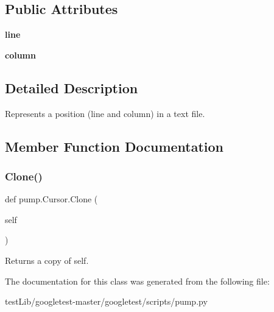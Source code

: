 \subsection*{Public Attributes}
\begin{DoxyCompactItemize}
\item 
\mbox{\label{classpump_1_1Cursor_aee8d8b67360da7fc4e635540cb41d48c}} 
{\bfseries line}
\item 
\mbox{\label{classpump_1_1Cursor_ae73db76c3a845a82afb334633864254e}} 
{\bfseries column}
\end{DoxyCompactItemize}


\subsection{Detailed Description}
\begin{DoxyVerb}Represents a position (line and column) in a text file.\end{DoxyVerb}
 

\subsection{Member Function Documentation}
\mbox{\label{classpump_1_1Cursor_af68c9be83b0af87db441b21bc6ce8114}} 
\subsubsection{\texorpdfstring{Clone()}{Clone()}}
{\footnotesize\ttfamily def pump.\+Cursor.\+Clone (\begin{DoxyParamCaption}\item[{}]{self }\end{DoxyParamCaption})}

\begin{DoxyVerb}Returns a copy of self.\end{DoxyVerb}
 

The documentation for this class was generated from the following file\+:\begin{DoxyCompactItemize}
\item 
test\+Lib/googletest-\/master/googletest/scripts/pump.\+py\end{DoxyCompactItemize}
